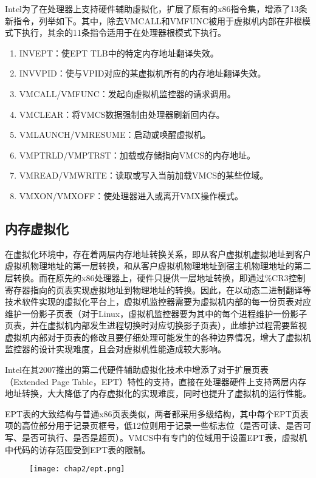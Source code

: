 Intel为了在处理器上支持硬件辅助虚拟化，扩展了原有的x86指令集，增添了13条新指令，列举如下。其中，除去VMCALL和VMFUNC被用于虚拟机内部在非根模式下执行，其余的11条指令适用于在处理器根模式下执行。

\begin{enumerate}
\item INVEPT：使EPT TLB中的特定内存地址翻译失效。
\item INVVPID：使与VPID对应的某虚拟机所有的内存地址翻译失效。
\item VMCALL/VMFUNC：发起向虚拟机监控器的请求调用。
\item VMCLEAR：将VMCS数据强制由处理器刷新回内存。
\item VMLAUNCH/VMRESUME：启动或唤醒虚拟机。
\item VMPTRLD/VMPTRST：加载或存储指向VMCS的内存地址。
\item VMREAD/VMWRITE：读取或写入当前加载VMCS的某些位域。
\item VMXON/VMXOFF：使处理器进入或离开VMX操作模式。
\end{enumerate}

\subsection{内存虚拟化}

在虚拟化环境中，存在着两层内存地址转换关系，即从客户虚拟机虚拟地址到客户虚拟机物理地址的第一层转换，和从客户虚拟机物理地址到宿主机物理地址的第二层转换。而在原先的x86处理器上，硬件只提供一层地址转换，即通过\%CR3控制寄存器指向的页表实现虚拟地址到物理地址的转换。因此，在以动态二进制翻译等技术软件实现的虚拟化平台上，虚拟机监控器需要为虚拟机内部的每一份页表对应维护一份影子页表（对于Linux，虚拟机监控器要为其中的每个进程维护一份影子页表，并在虚拟机内部发生进程切换时对应切换影子页表），此维护过程需要监视虚拟机内部对于页表的修改且要仔细处理可能发生的各种边界情况，增大了虚拟机监控器的设计实现难度，且会对虚拟机性能造成较大影响。

Intel在其2007推出的第二代硬件辅助虚拟化技术中增添了对于扩展页表（Extended Page Table，EPT）特性的支持，直接在处理器硬件上支持两层内存地址转换，大大降低了内存虚拟化的实现难度，同时也提升了虚拟机的运行性能。

EPT表的大致结构与普通x86页表类似，两者都采用多级结构，其中每个EPT页表项的高位部分用于记录页框号，低12位则用于记录一些标志位（是否可读、是否可写、是否可执行、是否是超页）。VMCS中有专门的位域用于设置EPT表，虚拟机中代码的访存范围受到EPT表的限制。

\begin{figure}[!htp]
  \centering
  \texttt{[image: chap2/ept.png]}
\end{figure}

